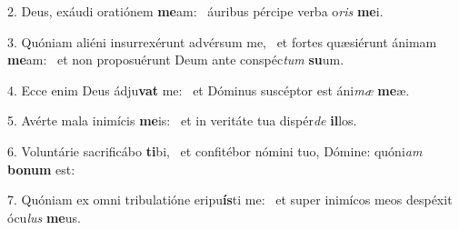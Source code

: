 2. Deus, exáudi oratiónem \textbf{me}am: \ast\  áuribus pércipe verba o\textit{ris} \textbf{me}i.\

3. Quóniam aliéni insurrexérunt advérsum me, \dag\  et fortes quæsiérunt ánimam \textbf{me}am: \ast\  et non proposuérunt Deum ante conspéc\textit{tum} \textbf{su}um.\

4. Ecce enim Deus ádju\textbf{vat} me: \ast\  et Dóminus suscéptor est áni\textit{mæ} \textbf{me}æ.\

5. Avérte mala inimícis \textbf{me}is: \ast\  et in veritáte tua dispér\textit{de} \textbf{il}los.\

6. Voluntárie sacrificábo \textbf{ti}bi, \ast\  et confitébor nómini tuo, Dómine: quóni\textit{am} \textbf{bo}\textbf{num} est:\

7. Quóniam ex omni tribulatióne eripu\textbf{ís}ti me: \ast\  et super inimícos meos despéxit ócu\textit{lus} \textbf{me}us.\


